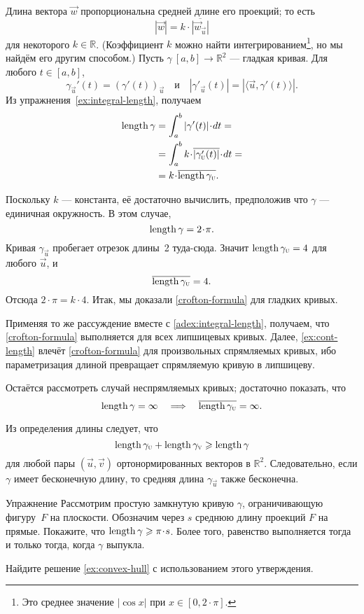 Длина вектора ${\vec w}$ пропорциональна средней длине его проекций; то есть
\[|{\vec w}|=k\cdot \overline{|{\vec w}_{\vec u}|}\]
для некоторого $k \in \mathbb{R}$.
(Коэффициент $k$ можно найти интегрированием\footnote{Это среднее значение $|\cos x|$ при $x\in [0,2\cdot\pi]$.}, но мы найдём его другим способом.)
Пусть $\gamma\:[a,b]\to\mathbb{R}^2$ --- гладкая кривая.
Для любого $t \in [a,b]$,
\[\gamma_{\vec u}'(t)=(\gamma'(t))_{\vec u}
\quad\text{и}\quad
|\gamma'_{\vec u}(t)|=|\langle\vec u,\gamma'(t)\rangle|.\]
Из упражнения~\ref{ex:integral-length}, получаем
\begin{align*}
\length\gamma
&=\int_a^b|\gamma'(t)|\cdot dt=
\\
&=\int_a^b  k\cdot \overline{|\gamma_{\vec u}'(t)|}\cdot dt=
\\
&=k\cdot \overline{\length\gamma_{\vec u}}.
\end{align*}

Поскольку $k$ --- константа, её достаточно вычислить, предположив что $\gamma$ --- единичная окружность.
В этом случае,
\[\length \gamma=2\cdot\pi.\]
Кривая $\gamma_{\vec u}$ пробегает отрезок длины~2 туда-сюда.
Значит $\mathop{\rm length}\nolimits\gamma_{\text{\sc{u}}}=4$ для любого $\vec u$, и 
\[\overline{\mathop{\rm length}\nolimits\gamma_{\text{\sc{u}}}} =4.\]
Отсюда $2\cdot \pi =k\cdot 4$.
Итак, мы доказали \ref{crofton-formula} для гладких кривых.

Применяя то же рассуждение вместе с \ref{adex:integral-length}, получаем, что \ref{crofton-formula} выполняется для всех липшицевых кривых.
Далее, \ref{ex:cont-length} влечёт \ref{crofton-formula} для произвольных спрямляемых кривых,
ибо параметризация длиной превращает спрямляемую кривую в липшицеву.

Остаётся рассмотреть случай неспрямляемых кривых;
достаточно показать, что 
\[\mathop{\rm length}\nolimits\gamma=\infty
\quad\Longrightarrow\quad
\overline{\mathop{\rm length}\nolimits\gamma_{\text{\sc{u}}}}=\infty.
\]

Из определения длины следует, что
\[\mathop{\rm length}\nolimits\gamma_{\text{\sc{u}}}+\mathop{\rm length}\nolimits\gamma_{\text{\sc{v}}}\geqslant \mathop{\rm length}\nolimits\gamma\]
для любой пары $(\vec u , \vec v )$ ортонормированных векторов в $\mathbb{R}^2$.
Следовательно, если $\gamma$ имеет бесконечную длину, то средняя длина $\gamma_{\vec u}$ также бесконечна.
\qeds

\begin{thm}{Упражнение}\label{ex:convex-croftons}
Рассмотрим простую замкнутую кривую $\gamma$, ограничивающую фигуру~$F$ на плоскости.
Обозначим через $s$ среднюю длину проекций $F$ на прямые.
Покажите, что $\length\gamma\ge \pi \cdot s$.
Более того, равенство выполняется тогда и только тогда, когда $\gamma$ выпукла.

Найдите решение \ref{ex:convex-hull} с использованием этого утверждения.
\end{thm}


